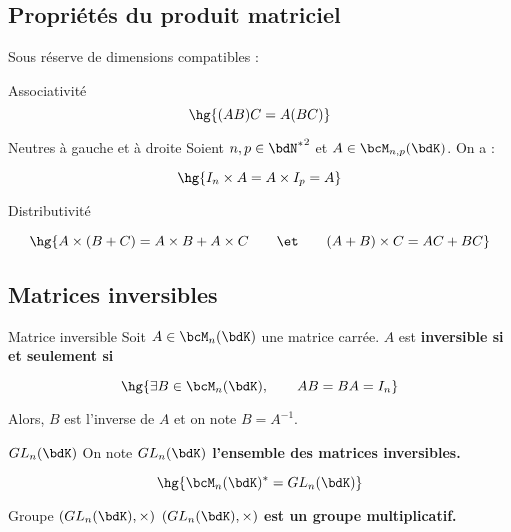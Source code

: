 \documentclass[a4paper,french,bookmarks]{article}
\begin{document}
\subsection{Propriétés du produit matriciel}

Sous réserve de dimensions compatibles :

\begin{property}{Associativité}{}
    \[ \hg{(AB)C = A(BC)}\]
\end{property}


\begin{property}{Neutres à gauche et à droite}{}
    Soient $n, p \in {\bdN^*}^2$ et $A \in \bcM_{n, p}(\bdK)$. On a :
    
    \[ \hg{I_n\times A = A \times I_p = A}\]
\end{property}

\begin{property}{Distributivité}{}
    
    
    \[ \hg{A\times(B + C) = A\times B + A \times C \qquad\et\qquad (A + B)\times C = AC + BC}\]
\end{property}

\subsection{Matrices inversibles}
    
\begin{definition}{Matrice inversible}{}
    Soit $A \in \bcM_n(\bdK)$ une matrice carrée. $A$ est \bf{inversible} si et seulement si
    
    \[ \hg{\exists B \in \bcM_n(\bdK), \qquad AB = BA = I_n}\]
\end{definition}
Alors, $B$ est l'inverse de $A$ et on note $B = A^{-1}$.

\begin{definition}{$GL_n(\bdK)$}{}
    On note \bf{$GL_n(\bdK)$} l'ensemble des \bf{matrices inversibles}.
    
    \[\hg{\bcM_n(\bdK)^* = GL_n(\bdK)}\]
\end{definition}

\begin{property}{Groupe $(GL_n(\bdK), \times)$}{}
    \bf{$(GL_n(\bdK), \times)$} est \bf{un groupe multiplicatif}.
\end{property}

\end{document}
